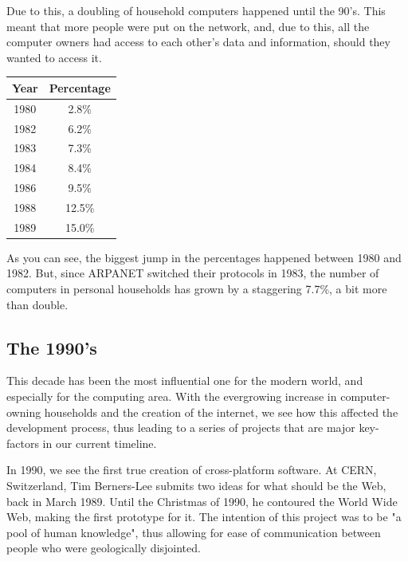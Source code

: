 \par
Due to this, a doubling of household computers happened until the 90's.
This meant that more people were put on the network, and, due to this, all the computer owners had access to each other's data and information, should they wanted to access it.
\begin{center}
    \begin{tabular}{|| c | c ||}
          \hline
          \textbf{Year} & \textbf{Percentage} \\
          \hline
          1980 & 2.8\% \\
          \hline
          1982 & 6.2\% \\
          \hline
          1983 & 7.3\% \\
          \hline
          1984 & 8.4\% \\
          \hline
          1986 & 9.5\% \\
          \hline
          1988 & 12.5\% \\
          \hline
          1989 & 15.0\% \\
          \hline
    \end{tabular}
\end{center}

\par
As you can see, the biggest jump in the percentages happened between 1980 and 1982.
But, since ARPANET switched their protocols in 1983, the number of computers in personal households has grown by a staggering 7.7\%, a bit more than double.

\subsection{The 1990's}
This decade has been the most influential one for the modern world, and especially for the computing area.
With the evergrowing increase in computer-owning households and the creation of the internet, we see how this affected the development process, thus leading to a series of projects that are major key-factors in our current timeline.

\par
In 1990, we see the first true creation of cross-platform software.
At CERN, Switzerland, Tim Berners-Lee submits two ideas for what should be the Web, back in March 1989.
Until the Christmas of 1990, he contoured the World Wide Web, making the first prototype for it.
The intention of this project was to be "a pool of human knowledge", thus allowing for ease of communication between people who were geologically disjointed\cite{worldWideWeb}.

